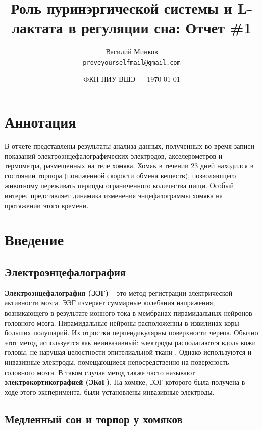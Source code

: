 \documentclass[12pt,a4paper,oneside]{article}
\title{Роль пуринэргической системы и L-лактата в регуляции сна: Отчет \#1} %
\author{Василий Минков\\ \texttt{proveyourselfmail@gmail.com}} %
\date{ФКН НИУ ВШЭ --- \today} %
\begin{document}
\maketitle %


\tableofcontents

\section{Аннотация}

В отчете представлены результаты анализа данных, полученных во время записи показаний электроэнцефалографических электродов, акселерометров и термометра, размещенных на теле хомяка. Хомяк в течении 23 дней находился в состоянии торпора (пониженной скорости обмена веществ), позволяющего животному переживать периоды ограниченного количества пищи. Особый интерес представляет динамика изменения энцефалограммы хомяка на протяжении этого времени.

\newpage

\section{Введение}

\subsection{Электроэнцефалография}

\textbf{Электроэнцефалография (ЭЭГ)} -- это метод регистрации электрической активности мозга. ЭЭГ измеряет суммарные колебания напряжения, возникающего в результате ионного тока в мембранах пирамидальных нейронов головного мозга. Пирамидальные нейроны расположенны в извилинах коры больших полушарий. Их отростки перпендикулярны поверхности черепа. Обычно этот метод используется как неинвазивный: электроды располагаются вдоль кожи головы, не нарушая целостности эпителиальной ткани \cite{Luck2005}. Однако используются и инвазивные электроды, помещающиеся непосредственно на поверхность головного мозга. В таком случае метод также часто называют \textbf{электрокортикографией (ЭКоГ)}. На хомяке, ЭЭГ которого была получена в ходе этого эксперимента, были установлены инвазивные электроды.

\subsection{Медленный сон и торпор у хомяков}
\end{document}
